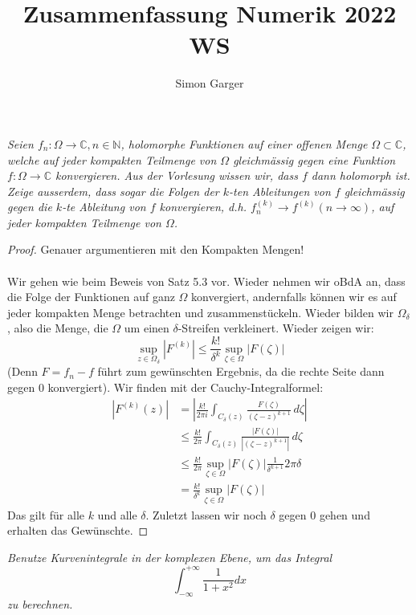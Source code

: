 \documentclass[11pt]{article}
\title{Zusammenfassung Numerik 2022 WS}
\author{Simon Garger}
\newenvironment{problem}[2][Beispiel]{
    \begin{trivlist}
        \item[\hskip \labelsep {\bfseries #1}\hskip \labelsep {\bfseries #2.}] \itshape}{
    \end{trivlist}\normalshape
}
\begin{document}
    \begin{problem}{1}
        Seien $f_n: \Omega \rightarrow \mathbb{C}, n \in \mathbb{N}$, holomorphe Funktionen auf einer
        offenen Menge $\Omega \subset \mathbb{C}$, welche auf jeder kompakten Teilmenge von $\Omega$
        gleichmässig gegen eine Funktion $f: \Omega \rightarrow \mathbb{C}$ konvergieren. Aus der Vorlesung
        wissen wir, dass $f$ dann holomorph ist. Zeige ausserdem, dass sogar die Folgen der $k$-ten Ableitungen
        von $f$ gleichmässig gegen die $k$-te Ableitung von $f$ konvergieren, d.h. $f_n^{(k)}
        \rightarrow f^{(k)}(n \rightarrow \infty)$, auf jeder kompakten Teilmenge von $\Omega$.
    \end{problem}

    \begin{proof}
        Genauer argumentieren mit den Kompakten Mengen! \\\\
        Wir gehen wie beim Beweis von Satz 5.3 vor. Wieder nehmen wir oBdA an, dass die Folge der Funktionen
        auf ganz $\Omega$ konvergiert, andernfalls können wir es auf jeder kompakten Menge betrachten und
        zusammenstückeln. Wieder bilden wir $\Omega_\delta$, also die Menge, die $\Omega$ um einen
        $\delta$-Streifen verkleinert. Wieder zeigen wir:
        $$\sup_{z\in\Omega_\delta} |F^{(k)}|\leq \frac{k!}{\delta^k} \sup_{\zeta\in \Omega}|F(\zeta)|$$
        (Denn $F = f_n-f$ führt zum gewünschten Ergebnis, da die rechte Seite dann gegen $0$ konvergiert).
        Wir finden mit der Cauchy-Integralformel:
        $$\begin{aligned}
              |F^{(k)}(z)|
              &= \left|\frac{k!}{2\pi i}\int_{C_\delta (z)}\frac{F(\zeta)}{(\zeta-z)^{k+1}}\,d\zeta\right|\\
              &\leq \frac{k!}{2\pi}\int_{C_\delta (z)}\frac{|F(\zeta)|}{|(\zeta-z)^{k+1}|}\,d\zeta\\
              &\leq \frac{k!}{2\pi}\sup_{\zeta \in\Omega} |F(\zeta)|\frac{1}{\delta^{k+1}} 2\pi\delta\\
              &= \frac{k!}{\delta^{k}}\sup_{\zeta \in\Omega} |F(\zeta)|
        \end{aligned}$$
        Das gilt für alle $k$ und alle $\delta$. Zuletzt lassen wir noch $\delta$ gegen $0$ gehen und erhalten
        das Gewünschte.
    \end{proof}

    \begin{problem}{2}
        Benutze Kurvenintegrale in der komplexen Ebene, um das Integral
        $$
        \int_{-\infty}^{+\infty} \frac{1}{1+x^2} d x
        $$
        zu berechnen.
    \end{problem}
\end{document}
